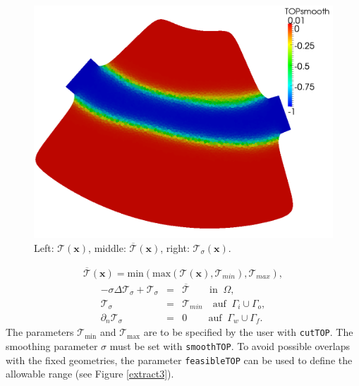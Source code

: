 \documentclass[oneside]{article}
\numberwithin{equation}{section}
\numberwithin{figure}{section}
\newcommand{\TT }{ \mathcal{T}}
\newcommand{\Om }{ \Omega}
\newcommand{\bxx}{\boldsymbol{x}}
\numberwithin{figure}{section}
\begin{document}
\begin{figure}[htbp]
    \includegraphics[scale=0.1]{TS2e5smooth.png}
    \caption{Left: $\TT\left(\bxx\right)$, \quad middle: $\overline{\TT}\left(\bxx\right)$, \quad right: $\TT_\sigma\left(\bxx\right)$.} 
    \label{Topo20}
\end{figure}
%
\begin{eqnarray}
\overline{\TT}\left(\bxx\right)=\mbox{min}\left(\mbox{max}\left(\TT\left(\bxx\right),\TT_{min}\right),\TT_{max}\right),
\end{eqnarray}
%
\begin{eqnarray}
- \sigma \Delta \TT_\sigma + \TT_\sigma &=& \overline{\TT} \qquad \mbox{in} \; \; \Om,\\
\TT_\sigma &=& \TT_{min} \quad \mbox{auf} \; \; \Gamma_i \cup \Gamma_o,\\
\partial_n \TT_\sigma &=& 0 \qquad \, \mbox{auf} \; \; \Gamma_w \cup \Gamma_f.
\end{eqnarray}
The parameters $\mathcal{T}_{\min}$ and $\mathcal{T}_{\max}$ are to be specified by the user with \texttt{cutTOP}. The smoothing parameter $\sigma$ must be set with \texttt{smoothTOP}. To avoid possible overlaps with the fixed geometries, the parameter \texttt{feasibleTOP} can be used to define the allowable range (see Figure \ref{extract3}).
\end{document}
